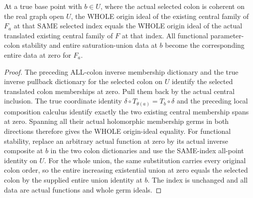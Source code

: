 \begin{lemma}
\label{hir:real-domain-same-index-whole-translated-central-dictionary}
\leanok
At a true base point with $b\in U$, where the actual selected colon is
coherent on the real graph open $U$, the WHOLE origin ideal of the existing
central family of $F_a$ at that SAME selected index equals the WHOLE origin
ideal of the actual translated existing central family of $F$ at that index.
All functional parameter-colon stability and entire saturation-union data
at $b$ become the corresponding entire data at zero for $F_a$.
\end{lemma}
\begin{proof}
The preceding ALL-colon inverse membership dictionary and the true inverse
pullback dictionary for the selected colon on $U$ identify the selected
translated colon memberships at zero. Pull them back by the actual central
inclusion. The true coordinate identity
$\delta\circ T_{\theta(a)}=T_b\circ\delta$ and the preceding local composition
calculus identify exactly the two existing central membership spans at zero.
Spanning all their actual holomorphic membership germs in both directions
therefore gives the WHOLE origin-ideal equality. For functional stability,
replace an arbitrary actual function at zero by its actual inverse composite
at $b$ in the two colon dictionaries and use the SAME-index all-point identity
on $U$. For the whole union, the same substitution carries every original
colon order, so the entire increasing existential union at zero equals the
selected colon by the supplied entire union identity at $b$. The index is
unchanged and all data are actual functions and whole germ ideals.
\end{proof}

